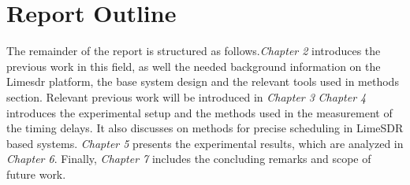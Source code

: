\section{Report Outline}
The remainder of the report is structured as follows.\textit{Chapter 2} introduces the previous work in this field, as well the needed background information on the Lime\ac{sdr} platform, the base system design and the relevant tools used in methods section.
Relevant previous work will be introduced in \textit{Chapter 3}
\textit{Chapter 4} introduces the experimental setup and the methods used in the measurement of the timing delays. It also discusses on methods for precise scheduling in LimeSDR based systems. \textit{Chapter 5} presents the experimental results, which are analyzed in \textit{Chapter 6}. Finally, \textit{Chapter 7} includes the concluding remarks and scope of future work.
